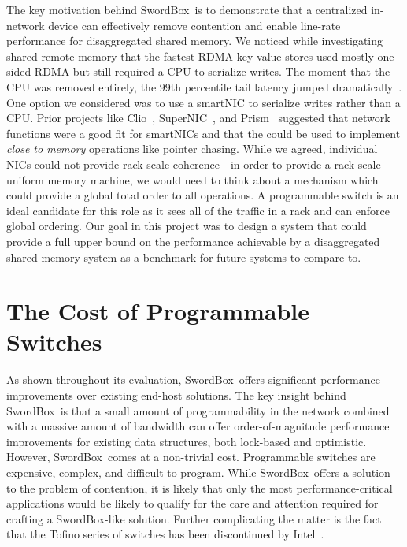 \documentclass[12pt]{ucsddissertation}
\newcommand{\sword}{SwordBox}
\begin{document}
The key motivation behind \sword\ is to demonstrate that a centralized in-network device can
effectively remove contention and enable line-rate performance for  disaggregated shared memory. We
noticed while investigating shared remote memory that the fastest RDMA key-value stores used mostly
one-sided RDMA but still required a CPU to serialize writes. The moment that the CPU was removed
entirely, the 99th percentile tail latency jumped dramatically~\cite{clover}. One option we
considered was to use a smartNIC to serialize writes rather than a CPU. Prior projects like
Clio~\cite{clio}, SuperNIC~\cite{supernic}, and Prism~\cite{prism} suggested that network functions
were a good fit for smartNICs and that the could be used to implement \textit{close to memory}
operations like pointer chasing. While we agreed, individual NICs could not provide rack-scale
coherence—in order to provide a rack-scale uniform memory machine, we would need to think about a
mechanism which could provide a global total order to all operations. A programmable switch is an
ideal candidate for this role as it sees all of the traffic in a rack and can enforce global
ordering. Our goal in this project was to design a system that could provide a full upper bound on
the performance achievable by a disaggregated shared memory system as a benchmark for future systems
to compare to.


% 
% 
% 
% 
% 
% 

\section{The Cost of Programmable Switches}

As shown throughout its evaluation, \sword\ offers significant performance improvements over
existing end-host solutions. The key insight behind \sword\ is that a small amount of
programmability in the network combined with a massive amount of bandwidth can offer
order-of-magnitude performance improvements for existing data structures, both lock-based and
optimistic. However, \sword\ comes at a non-trivial cost. Programmable switches are expensive,
complex, and difficult to program. While \sword\ offers a solution to the problem of contention, it
is likely that only the most performance-critical applications would be likely to qualify for the
care and attention required for crafting a \sword-like solution. Further complicating the matter is
the fact that the Tofino series of switches has been discontinued by Intel~\cite{tofino-cancelled}.
\end{document}
